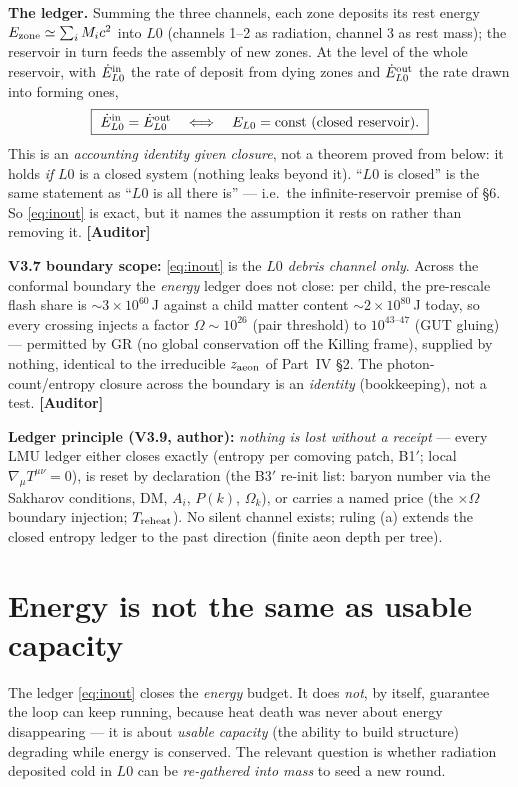 \documentclass[11pt]{article}
\newcommand{\Auditor}{\textbf{\textcolor{teal!55!black}{[Auditor]}}}
\begin{document}
\textbf{The ledger.} Summing the three channels, each zone deposits its rest energy $E_{\rm zone}\simeq\sum_i M_i c^2$ into $L0$ (channels 1--2 as radiation, channel 3 as rest mass); the reservoir in turn feeds the assembly of new zones. At the level of the whole reservoir, with $\dot E^{\rm in}_{L0}$ the rate of deposit from dying zones and $\dot E^{\rm out}_{L0}$ the rate drawn into forming ones,
\begin{equation}
\boxed{\ \dot E^{\rm in}_{L0}=\dot E^{\rm out}_{L0}\quad\Longleftrightarrow\quad E_{L0}=\text{const (closed reservoir).}\ }
\label{eq:inout}
\end{equation}
This is an \emph{accounting identity given closure}, not a theorem proved from below: it holds \emph{if} $L0$ is a closed system (nothing leaks beyond it). ``$L0$ is closed'' is the same statement as ``$L0$ is all there is'' --- i.e.\ the infinite-reservoir premise of \S6. So \eqref{eq:inout} is exact, but it names the assumption it rests on rather than removing it. \Auditor\par\textbf{V3.7 boundary scope:} \eqref{eq:inout} is the \emph{$L0$ debris channel only}. Across the conformal boundary the \emph{energy} ledger does not close: per child, the pre-rescale flash share is $\sim3\times10^{60}$\,J against a child matter content $\sim2\times10^{80}$\,J today, so every crossing injects a factor $\Omega\sim10^{26}$ (pair threshold) to $10^{43\text{--}47}$ (GUT gluing) --- permitted by GR (no global conservation off the Killing frame), supplied by nothing, identical to the irreducible $z_{\rm aeon}$ of Part~IV \S2. The photon-count/entropy closure across the boundary is an \emph{identity} (bookkeeping), not a test. \Auditor\par\textbf{Ledger principle (V3.9, author):} \emph{nothing is lost without a receipt} --- every LMU ledger either closes exactly (entropy per comoving patch, B1$'$; local $\nabla_\mu T^{\mu\nu}=0$), is reset by declaration (the B3$'$ re-init list: baryon number via the Sakharov conditions, DM, $A_i$, $P(k)$, $\Omega_k$), or carries a named price (the $\times\Omega$ boundary injection; $T_{\rm reheat}$). No silent channel exists; ruling (a) extends the closed entropy ledger to the past direction (finite aeon depth per tree).

\section{Energy is not the same as usable capacity}
The ledger \eqref{eq:inout} closes the \emph{energy} budget. It does \emph{not}, by itself, guarantee the loop can keep running, because heat death was never about energy disappearing --- it is about \emph{usable capacity} (the ability to build structure) degrading while energy is conserved. The relevant question is whether radiation deposited cold in $L0$ can be \emph{re-gathered into mass} to seed a new round.
\end{document}
